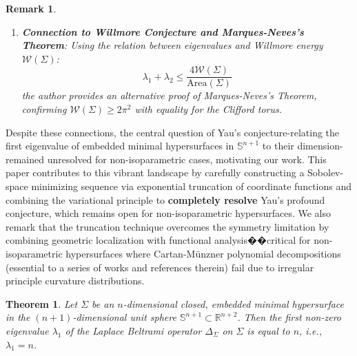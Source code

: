 \documentclass[a4, 12pt]{amsart}
\numberwithin{equation}{section} \numberwithin{equation}{section}
\newtheorem{thm}{Theorem}[section]
\newtheorem{rem}{Remark}[section]{\bfseries\upshape}
\begin{document}
\begin{rem}
\begin{enumerate}
    \item \textbf{Connection to Willmore Conjecture and Marques-Neves's Theorem}: Using the relation between eigenvalues and Willmore energy $\mathcal{W}(\Sigma)$:
    \begin{equation*}
    \lambda_1 + \lambda_2 \leq \frac{4\mathcal{W}(\Sigma)}{\text{Area}(\Sigma)}
    \end{equation*}
    the author provides an alternative proof of Marques-Neves's Theorem, confirming $\mathcal{W}(\Sigma) \geq 2\pi^2$ with equality for the Clifford torus.
\end{enumerate}
\end{rem}




Despite these connections, the central question of Yau's conjecture-relating the first eigenvalue of embedded minimal hypersurfaces in $\mathbb{S}^{n+1}$ to their dimension-remained unresolved for non-isoparametric cases, motivating our work.
This paper contributes to this vibrant landscape by carefully constructing a Sobolev-space minimizing sequence via exponential truncation of coordinate functions and combining the variational principle to \textbf{completely resolve} Yau's profound conjecture, which remains open for non-isoparametric hypersurfaces.
We also remark that the truncation technique overcomes the symmetry limitation by combining geometric localization with functional analysis��critical for non-isoparametric hypersurfaces where Cartan-M\"{u}nzner polynomial decompositions (essential to a series of works \cite{TY1,Ko,Mut1,Mut2} and references therein) fail due to irregular principle curvature distributions.







\begin{thm}\label{main-thm}Let $\Sigma$ be an $n$-dimensional closed, embedded minimal hypersurface   in the $(n+1)$-dimensional unit sphere $\mathbb{S}^{n+1} \subset \mathbb{R}^{n+2}$. Then the first non-zero eigenvalue $\lambda_{1}$ of the Laplace Beltrami operator $\Delta_{\Sigma}$ on $\Sigma$ is equal to $n$, i.e., $\lambda_{1}=n$.\end{thm}
\end{document}
